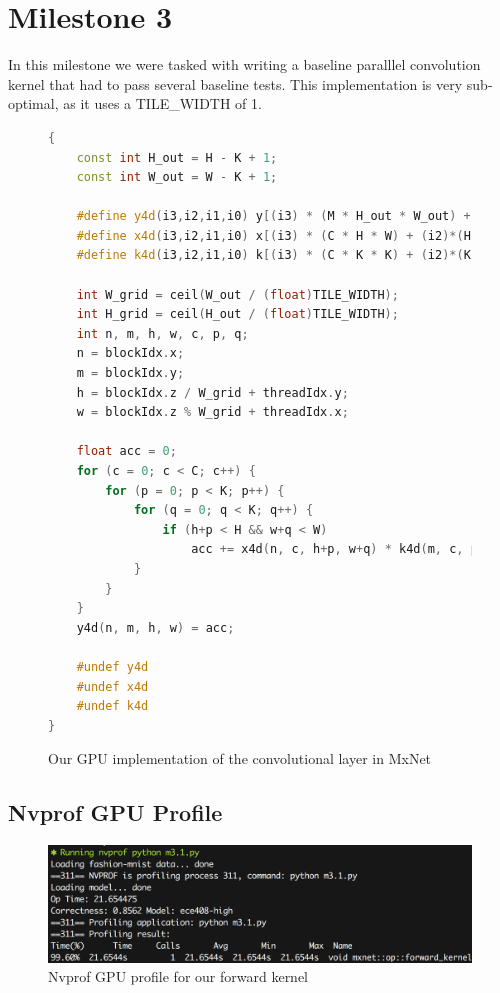 \documentclass[titlepage]{article}
\begin{document}
\newpage
\section*{Milestone 3}
In this milestone we were tasked with writing a baseline paralllel convolution kernel that had to pass several baseline tests. This implementation is very sub-optimal, as it uses a TILE\_WIDTH of 1.
\begin{figure}[h!]
\begin{lstlisting}[language=C++]
{
    const int H_out = H - K + 1;
    const int W_out = W - K + 1;
    
    #define y4d(i3,i2,i1,i0) y[(i3) * (M * H_out * W_out) + (i2)*(H_out * W_out) + (i1)*(W_out) + i0]
    #define x4d(i3,i2,i1,i0) x[(i3) * (C * H * W) + (i2)*(H * W) + (i1)*(W) + i0]
    #define k4d(i3,i2,i1,i0) k[(i3) * (C * K * K) + (i2)*(K * K) + (i1)*(K) + i0]

    int W_grid = ceil(W_out / (float)TILE_WIDTH);
    int H_grid = ceil(H_out / (float)TILE_WIDTH);
    int n, m, h, w, c, p, q;
    n = blockIdx.x;
    m = blockIdx.y;
    h = blockIdx.z / W_grid + threadIdx.y;
    w = blockIdx.z % W_grid + threadIdx.x;
    
    float acc = 0;
    for (c = 0; c < C; c++) {
        for (p = 0; p < K; p++) {
            for (q = 0; q < K; q++) {
                if (h+p < H && w+q < W)
                    acc += x4d(n, c, h+p, w+q) * k4d(m, c, p, q);
            }
        }
    }
    y4d(n, m, h, w) = acc;

    #undef y4d
    #undef x4d
    #undef k4d
}
\end{lstlisting}
\caption{Our GPU implementation of the convolutional layer in MxNet}
\end{figure}

\newpage
\subsection*{Nvprof GPU Profile}
\begin{figure}[h!]
\includegraphics[width=\linewidth]{nvprof.png}
\caption{Nvprof GPU profile for our forward kernel}
\label{fig:flowFree}
\end{figure}
\end{document}
